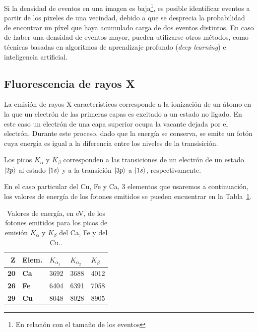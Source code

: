 \documentclass[twoside,twocolumn]{article}
\DeclarePairedDelimiter\ket{\lvert}{\rangle}
\begin{document}
      Si la densidad de eventos en una imagen es baja\footnote{En relación con el tamaño de los eventos},
      es posible identificar eventos a partir de los pixeles de una vecindad,
      debido a que se desprecia la probabilidad de encontrar un píxel que haya acumulado carga de dos eventos distintos.
      En caso de haber una densidad de eventos mayor, pueden utilizarse otros métodos, como técnicas basadas en
      algoritmos de aprendizaje profundo (\emph{deep learning}) e inteligencia artificial. \cite{ROE2005577} 
      
    \subsection{Fluorescencia de rayos X}\label{sec:intro:peaks}

      La emisión de rayos X característicos corresponde a la ionización de un átomo en la que un
      electrón de las primeras capas es excitado a un estado no ligado.
      En este caso un electrón de una capa superior ocupa la vacante dejada por el electrón.
      Durante este proceso, dado que la energía se conserva, se emite un fotón
      cuya energía es igual a la diferencia entre los niveles de la transisición.

      Los picos $K_\alpha$ y $K_\beta$ corresponden a las transiciones de un electrón de un estado
      $\ket{2p}$ al estado $\ket{1s}$ y a la transición $\ket{3p}$ a $\ket{1s}$, respectivamente.
      
      En el caso particular del Cu, Fe y Ca, 3 elementos que usaremos a continuación,
      los valores de energía de los fotones emitidos se pueden encuentrar
      en la Tabla~\ref{tab:xraypeaks}.

      \begin{table}[h]
        \centering
        \begin{tabular}{|rl|ll|l|} \hline
        \textbf{Z}  & \textbf{\small{Elem.}} & $K_{\alpha_1}$ & $K_{\alpha_2}$ & $K_\beta$ \\ \hline
        \textbf{20} & \textbf{Ca}       & 3692         & 3688         & 4012        \\
        \textbf{26} & \textbf{Fe}       & 6404         & 6391         & 7058        \\
        \textbf{29} & \textbf{Cu}       & 8048         & 8028         & 8905       \\ \hline
        \end{tabular}
        \caption{Valores de energía, en eV, de los fotones emitidos para los picos de emisión 
          $K_{\alpha}$ y $K_{\beta}$ del Ca, Fe y del Cu.\cite{xraybooklet}.}
        \label{tab:xraypeaks}
        \end{table}
\end{document}
